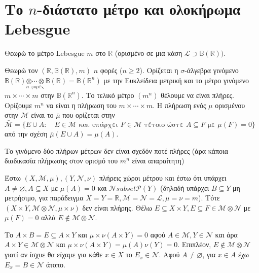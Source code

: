 \pagebreak
\section{Το $n$-διάστατο μέτρο και ολοκήρωμα Lebesgue}


Θεωρώ το μέτρο Lebesgue $m$ στο $\mathbb R$ (ορισμένο σε μια κάση $\mathcal L \supset \mathbb B (\mathbb{R}))$.

\begin{definition}
    Θεωρώ τον $(\mathbb{R}, \mathbb{B}(\mathbb{R}),m)$ $n$ φορές ($n \geq 2$). Ορίζεται η $\sigma$-άλγεβρα γινόμενο $ \mathbb{B}(\mathbb{R}) \underset{ n \textrm{ φορές }}{ \otimes \cdots \otimes} \mathbb{B}(\mathbb{R}) = \mathbb B (\mathbb{R}^n)$ με την Ευκλείδεια μετρική και το μέτρο γινόμενο $m \times \cdots \times m$ στην $\mathbb B (\mathbb{R}^n)$. Το τελικό μέτρο $(m^n)$ θέλουμε να είναι πλήρες. Ορίζουμε $m^n$ να είναι η πλήρωση του $m \times \cdots \times m$. Η πλήρωση ενός $\mu$ ορισμένου στην $\mathcal M$ είναι το $\bar{\mu}$ που ορίζεται στην $\bar{\mathcal M} = \{ E\cup A: \quad E\in \mathcal M \textrm{ και υπάρχει } F \in \mathcal M \textrm{ τέτοιο ώστε } A \subseteq F \textrm{ με } \mu (F) = 0 \}$ από την σχέση $\bar{\mu}(E\cup A) = \mu(A)$.
\end{definition}


\begin{remark}Το γινόμενο δύο πλήρων μέτρων δεν είναι σχεδόν ποτέ πλήρες (άρα κάποια διαδικασία πλήρωσης στον ορισμό του $m^n$ είναι απαραίτητη)
\end{remark}


Έστω $(X,\mathcal M, \mu), (Y,\mathcal N, \nu)$ πλήρεις χώροι μέτρου και έστω ότι υπάρχει $A \neq \varnothing, A\subseteq X$ με $\mu(A) = 0$ και $\mathcal N subset \mathcal P (Y)$ (δηλαδή υπάρχει $B \subseteq Y$ μη μετρήσιμο, για παράδειγμα $X= Y = \mathbb{R}, \mathcal M = \mathcal N = \mathcal L, \mu = \nu = m$). Τότε $(X\times Y, \mathcal M \otimes \mathcal N, \mu \times \nu)$ δεν είναι πλήρης. Θέλω $E \subseteq X\times Y, E\subseteq F \in \mathcal M \otimes \mathcal N$ με $\mu(F) = 0$ αλλά $E \not\in \mathcal M \otimes \mathcal N$.


Το $A \times B = E \subseteq A\times Y$ και $\mu \times \nu(A\times Y) = 0$ αφού $A \in \mathcal M, Y \in \mathcal N$ και άρα $A \times Y \in \mathcal M \otimes \mathcal N$ και $\mu \times \nu (A\times Y)  = \mu (A) \nu(Y) = 0$. Επιπλέον, $E \not\in \mathcal M \otimes \mathcal N$ γιατί αν ίσχυε θα είχαμε για κάθε $x \in X$ το $E_x \in \mathcal N$. Αφού $A \neq \varnothing$, για $x \in A$ έχω $E_x = B \in \mathcal N$ άτοπο.

